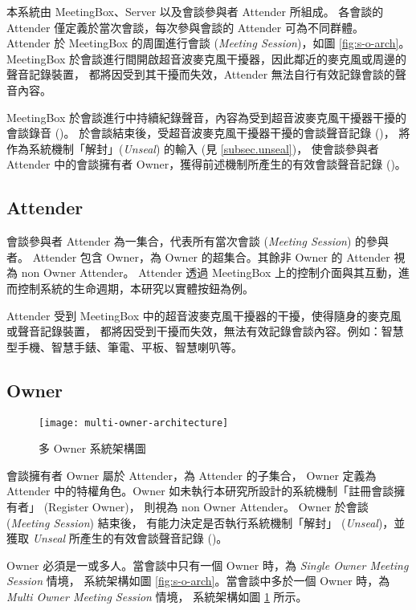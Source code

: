     本系統由 MeetingBox、Server 以及會談參與者 Attender 所組成。
各會談的 Attender 僅定義於當次會談，每次參與會談的 Attender 可為不同群體。
Attender 於 MeetingBox 的周圍進行會談 ({\it Meeting Session})，如圖 \ref{fig:s-o-arch}。
MeetingBox 於會談進行間開啟超音波麥克風干擾器，因此鄰近的麥克風或周邊的聲音記錄裝置，
都將因受到其干擾而失效，Attender 無法自行有效記錄會談的聲音內容。

    MeetingBox 於會談進行中持續紀錄聲音，內容為受到超音波麥克風干擾器干擾的會談錄音 (\DEFrecJ)。
於會談結束後，受超音波麥克風干擾器干擾的會談聲音記錄 (\DEFrecJ)，
將作為系統機制「解封」({\it Unseal}) 的輸入 (見 \ref{subsec.unseal})，
使會談參與者 Attender 中的會談擁有者 Owner，獲得前述機制所產生的有效會談聲音記錄 (\DEFrecREV)。


\subsection{Attender}

    會談參與者 Attender 為一集合，代表所有當次會談 ({\it Meeting Session}) 的參與者。
Attender 包含 Owner，為 Owner 的超集合。其餘非 Owner 的 Attender 視為 non Owner Attender。
Attender 透過 MeetingBox 上的控制介面與其互動，進而控制系統的生命週期，本研究以實體按鈕為例。

    Attender 受到 MeetingBox 中的超音波麥克風干擾器的干擾，使得隨身的麥克風或聲音記錄裝置，
都將因受到干擾而失效，無法有效記錄會談內容。例如：智慧型手機、智慧手錶、筆電、平板、智慧喇叭等。


\subsection{Owner}

\begin{figure}[H]
    \centering
    \texttt{[image: multi-owner-architecture]}
    \caption{多 Owner 系統架構圖}
    \label{fig:m-o-arch}
\end{figure}

    會談擁有者 Owner 屬於 Attender，為 Attender 的子集合，
Owner 定義為 Attender 中的特權角色。Owner 如未執行本研究所設計的系統機制「註冊會談擁有者」 (Register Owner)，
則視為 non Owner Attender。 Owner 於會談 ({\it Meeting Session}) 結束後，
有能力決定是否執行系統機制「解封」 ({\it Unseal})，並獲取 {\it Unseal} 所產生的有效會談聲音記錄 (\DEFrecREV)。

    Owner 必須是一或多人。當會談中只有一個 Owner 時，為 {\it Single Owner Meeting Session} 情境，
系統架構如圖 \ref{fig:s-o-arch}。當會談中多於一個 Owner 時，為 {\it Multi Owner Meeting Session} 情境，
系統架構如圖 \ref{fig:m-o-arch} 所示。

